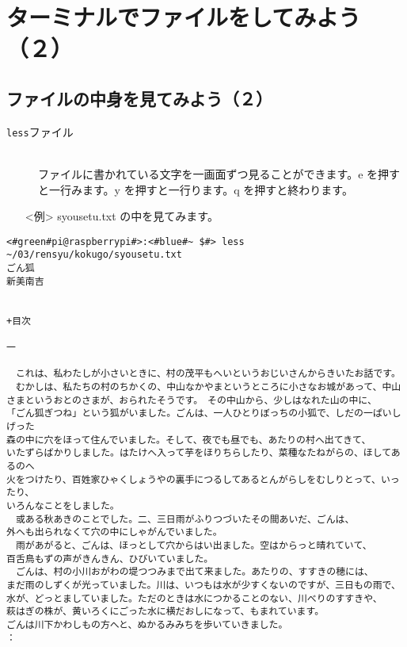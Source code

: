\newpage
\section{ターミナルでファイルをしてみよう（２）}

\subsection{ファイルの中身を見てみよう（２）}
\begin{description}
\item[\texttt{less}\textvisiblespace ファイル]\mbox{}\\
ファイルに書かれている文字を一画面ずつ見ることができます。e を押すと一行みます。y を押すと一行ります。q を押すと終わります。

\end{description}
\begin{itemize}
\item[<例>]syousetu.txt の中を見てみます。
\end{itemize}
\begin{lstlisting}[caption=lessの例, label=less]
<#green#pi@raspberrypi#>:<#blue#~ $#> less ~/03/rensyu/kokugo/syousetu.txt
ごん狐
新美南吉


+目次

一

　これは、私わたしが小さいときに、村の茂平もへいというおじいさんからきいたお話です。
　むかしは、私たちの村のちかくの、中山なかやまというところに小さなお城があって、中山
さまというおとのさまが、おられたそうです。　その中山から、少しはなれた山の中に、
「ごん狐ぎつね」という狐がいました。ごんは、一人ひとりぼっちの小狐で、しだの一ぱいしげった
森の中に穴をほって住んでいました。そして、夜でも昼でも、あたりの村へ出てきて、
いたずらばかりしました。はたけへ入って芋をほりちらしたり、菜種なたねがらの、ほしてあるのへ
火をつけたり、百姓家ひゃくしょうやの裏手につるしてあるとんがらしをむしりとって、いったり、
いろんなことをしました。
　或ある秋あきのことでした。二、三日雨がふりつづいたその間あいだ、ごんは、
外へも出られなくて穴の中にしゃがんでいました。
　雨があがると、ごんは、ほっとして穴からはい出ました。空はからっと晴れていて、
百舌鳥もずの声がきんきん、ひびいていました。
　ごんは、村の小川おがわの堤つつみまで出て来ました。あたりの、すすきの穂には、
まだ雨のしずくが光っていました。川は、いつもは水が少すくないのですが、三日もの雨で、
水が、どっとましていました。ただのときは水につかることのない、川べりのすすきや、
萩はぎの株が、黄いろくにごった水に横だおしになって、もまれています。
ごんは川下かわしもの方へと、ぬかるみみちを歩いていきました。
：
\end{lstlisting}

